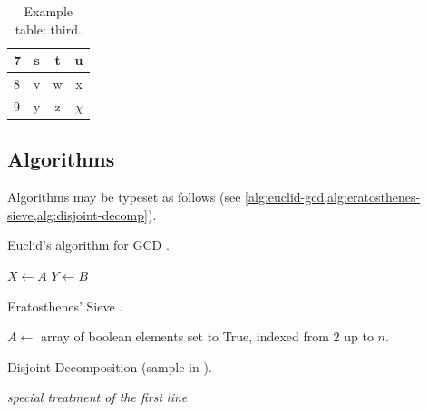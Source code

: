 \begin{table} \caption{\label{tab:example3} Example table: third.}
\begin{tabular}{l | c c c} \hline
7 & s & t & u \\ \hline
8 & v & w & x \\ \hline
9 & y & z & $\chi$ \\
\hline \end{tabular}
\end{table}

\subsection{Algorithms}
Algorithms may be typeset as follows
(see \cref{alg:euclid-gcd,alg:eratosthenes-sieve,alg:disjoint-decomp}).

\begin{algorithm}
\caption{\label{alg:euclid-gcd} Euclid's algorithm for \gls{GCD}
\cite{enwiki:euclid-algorithm}.}

\BlankLine
$X \gets A$\;
$Y \gets B$\;
\end{algorithm}

\begin{algorithm}
\caption{\label{alg:eratosthenes-sieve} Eratosthenes' Sieve
         \cite{enwiki:eratosthenes-sieve}.}
$A \gets$ array of boolean elements set to True, indexed from $2$ up to $n$.\;
\end{algorithm}

\begin{algorithm}
\caption{\label{alg:disjoint-decomp} Disjoint Decomposition
         (sample in \cite{algorithm2e}).}
\BlankLine
\emph{special treatment of the first line}\;
\end{algorithm}

